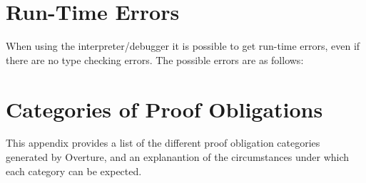 \documentclass{overturerepchap}
\begin{document}
\newpage
\chapter{Run-Time Errors}\label{app:runtimeerr}

When using the interpreter/debugger it is possible to get run-time
errors, even if there are no type checking errors. The possible errors
are as follows:



\newpage
\chapter{Categories of Proof Obligations}\label{app:POcategories}

This appendix provides a list of the different proof obligation
categories generated by Overture, and an explanantion of the
circumstances under which each category can be expected.
\end{document}
